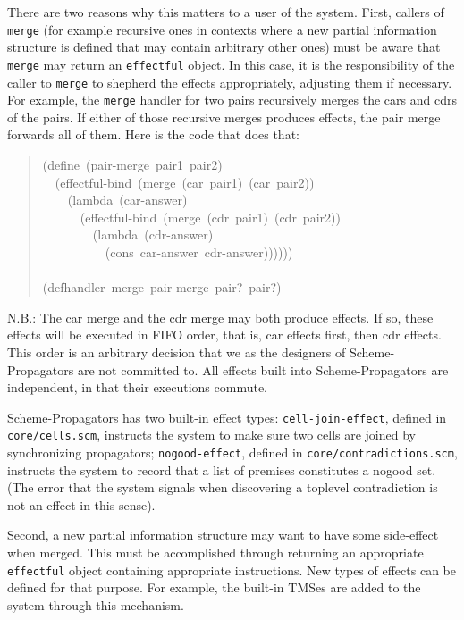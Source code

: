 \documentclass[12pt,letterpaper,english]{article}
\begin{document}
There are two reasons why this matters to a user of the system.
First, callers of \texttt{merge} (for example recursive ones in contexts
where a new partial information structure is defined that may contain
arbitrary other ones) must be aware that \texttt{merge} may return an
\texttt{effectful} object.  In this case, it is the responsibility of the
caller to \texttt{merge} to shepherd the effects appropriately, adjusting
them if necessary.  For example, the \texttt{merge} handler for two pairs
recursively merges the cars and cdrs of the pairs.  If either of those
recursive merges produces effects, the pair merge forwards all of
them.  Here is the code that does that:
\begin{quote}{\ttfamily \raggedright \noindent
(define~(pair-merge~pair1~pair2)~\\
~~(effectful-bind~(merge~(car~pair1)~(car~pair2))~\\
~~~~(lambda~(car-answer)~\\
~~~~~~(effectful-bind~(merge~(cdr~pair1)~(cdr~pair2))~\\
~~~~~~~~(lambda~(cdr-answer)~\\
~~~~~~~~~~(cons~car-answer~cdr-answer))))))~\\
~\\
(defhandler~merge~pair-merge~pair?~pair?)
}\end{quote}

N.B.: The car merge and the cdr merge may both produce effects.  If
so, these effects will be executed in FIFO order, that is, car effects
first, then cdr effects.  This order is an arbitrary decision that we
as the designers of Scheme-Propagators are not committed to.  All
effects built into Scheme-Propagators are independent, in that their
executions commute.

Scheme-Propagators has two built-in effect types:
\texttt{cell-join-effect}, defined in \texttt{core/cells.scm}, instructs the
system to make sure two cells are joined by synchronizing propagators;
\texttt{nogood-effect}, defined in \texttt{core/contradictions.scm}, instructs
the system to record that a list of premises constitutes a nogood set.
(The error that the system signals when discovering a toplevel
contradiction is not an effect in this sense).

Second, a new partial information structure may want to have some
side-effect when merged.  This must be accomplished through returning
an appropriate \texttt{effectful} object containing appropriate
instructions.  New types of effects can be defined for that purpose.
For example, the built-in TMSes are added to the system through this
mechanism.
\end{document}
